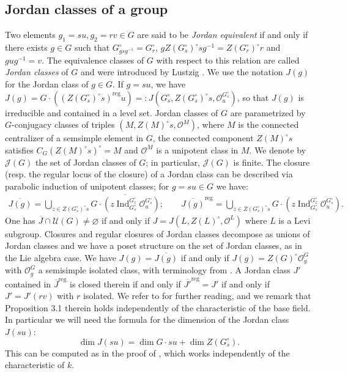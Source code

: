 \documentclass[12pt]{amsart}
\theoremstyle{definition}
\theoremstyle{remark}
\renewcommand{\O}{\mathcal{O}}
\newcommand{\U}{\mathcal{U}}
\newcommand{\reg}{{\operatorname{reg}}}
\newcommand{\Ind}{\operatorname{Ind}}
\begin{document}
\subsection{Jordan classes of a group}
Two elements $g_1 = su, g_2 = rv \in G$ are said to be \emph{Jordan equivalent } if and only if there exists $g \in G$ such that $G_{gs g^{-1}}^\circ = G_{r}^\circ$, $g Z(G_s^\circ)^\circ s g^{-1} = Z(G_r^\circ)^\circ r$ and $ g u g^{-1} = v$.
The equivalence classes of $G$ with respect to this relation are called \emph{Jordan classes} of $G$ and were introduced by Lustzig \cite{LusztigICC}.
We use the notation $J(g)$ for the Jordan class of $g \in G$.
If $g = su $, we have $J(g) = G \cdot ((Z(G_s^\circ)^\circ s)^\reg u) =: J(G_s^\circ, Z(G_s^\circ)^\circ s, \O^{G_s^\circ}_u)$, so that $J(g)$ is irreducible and  contained in a level set.
Jordan classes of $G$ are parametrized by $G$-conjugacy classes of triples $(M, Z(M)^\circ s, \O^M)$, where $M$ is the connected centralizer of a semsimple element in $G$, the connected component $Z(M)^\circ s$ satisfies $C_G(Z(M)^\circ s)^\circ = M$ and $\O^M$ is a unipotent class in $M$.
We denote by $\mathcal{J}(G)$ the set of Jordan classes of $G$; in particular, $\mathcal{J}(G)$  is finite.
The closure (resp. the regular locus of the closure) of a Jordan class can be described via parabolic induction of unipotent classes; for $g = su \in G$ we have:
\begin{align*}
\overline{J(g)} = \bigcup_{z \in Z(G_s^\circ)^\circ s} \overline{G \cdot \left( z\Ind_{G_s^\circ}^{G_z^\circ} \O^{G_s^\circ}_u \right)}; \qquad
\overline{J(g)}^\reg = \bigcup_{z \in Z(G_s^\circ)^\circ s} G \cdot \left( z\Ind_{G_s^\circ}^{G_z^\circ} \O^{G_s^\circ}_u \right).
\end{align*}
One has $\overline{J} \cap \U(G) \neq \varnothing$ if and only if $J = J(L, Z(L)^\circ, \O^L)$ where $L$ is a Levi subgroup.
Closures and regular closures of Jordan classes decompose as unions of Jordan classes and we have a poset structure on the set of Jordan classes, as in the Lie algebra case.
We have $J(g) = \overline{J(g)}$ if and only if $J(g) = Z(G)^\circ \O^G_g$ with $\O^G_g$ a semisimple isolated class, with terminology from \cite{LusztigICC}.
A Jordan class $J'$ contained
in $\overline{J}^\reg$
 is closed therein if and only if $\overline{J'}^\reg
=J'$  if and only if $J' = J'(rv)$ with $r$ isolated.
We refer to \cite[\S 3]{ACE} for further reading, and we remark that Proposition 3.1 therein holds independently of the characteristic of the base field.
In particular we will need the formula for the dimension of the Jordan class $J(su)$:
\begin{equation} \label{dim_form}
\dim J(su) = \dim G \cdot su + \dim Z(G_s^\circ).
\end{equation}
This can be computed as in the proof of \cite[Theorem 5.6 (e)]{CE1}, which works independently of the characteristic of $k$.
\end{document}
